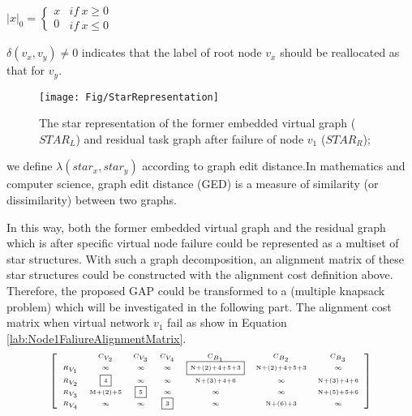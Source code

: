 $|x|_0 = \left\{ \begin{array}{l}
{x}\\
0
\end{array} \right.\begin{array}{*{20}{c}}
if\ x\geq 0\\
{if\ x\leq 0}
\end{array}$

$\delta(v_x,v_y)\neq 0$ indicates that the label of root node $v_x$ should be reallocated as that for $v_y$.
\begin{figure}
\centering
\texttt{[image: Fig/StarRepresentation]}\\
  \caption{The star representation of the former embedded virtual graph ($STAR_L$) and residual task graph after failure of node $v_1$ ($STAR_R$);}\label{fig:StarRepresentation}
\end{figure}

we define $\lambda(star_x,star_y)$ according to graph edit distance\cite{sanfeliu1983distance}.In mathematics and computer science, graph edit distance (GED) is a measure of similarity (or dissimilarity) between two graphs.

In this way, both the former embedded virtual graph and the residual graph which is after specific virtual node failure could be represented as a multiset of star structures. With such a graph decomposition, an alignment matrix of these star structures could be constructed with the alignment cost definition above. Therefore, the proposed GAP could be transformed to a (multiple knapsack problem) which will be investigated in the following part. The alignment cost matrix when virtual network $v_1$ fail as show in Equation \ref{lab:Node1FaliureAlignmentMatrix}.
\begin{equation*}
\tiny{
\left[ {\begin{array}{*{20}{c}}
&C_{V_{2}}&C_{V_3}&C_{V_4}&C_{B_{1}}&C_{B_{2}}&C_{B_{3}}\\
{R_{V_1}}&\infty&\infty&\infty&\fbox{N+(2)+4+5+3}&${N+(2)+4+5+3}$&\infty\\
R_{V_2}&\fbox{4}&\infty&\infty&${N+(3)+4+6}$&\infty&${N+(3)+4+6}$\\
R_{V_3}&${M+(2)+5}$&\fbox{5}&\infty&\infty&\infty&${N+(5)+5+6}$\\
R_{V_4}&\infty&\infty&\fbox{3}&\infty&${N+(6)+3}$&\infty\\
\end{array}} \right]
}
\label{lab:Node1FaliureAlignmentMatrix}
\end{equation*}

